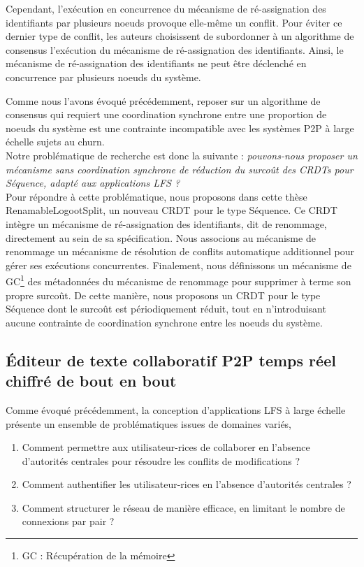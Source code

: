 Cependant, l'exécution en concurrence du mécanisme de ré-assignation des identifiants par plusieurs noeuds provoque elle-même un conflit.
Pour éviter ce dernier type de conflit, les auteurs choisissent de subordonner à un algorithme de consensus l'exécution du mécanisme de ré-assignation des identifiants.
Ainsi, le mécanisme de ré-assignation des identifiants ne peut être déclenché en concurrence par plusieurs noeuds du système.

Comme nous l'avons évoqué précédemment, reposer sur un algorithme de consensus qui requiert une coordination synchrone entre une proportion de noeuds du système est une contrainte incompatible avec les systèmes \ac{P2P} à large échelle sujets au churn.\\

Notre problématique de recherche est donc la suivante : \emph{pouvons-nous proposer un mécanisme sans coordination synchrone de réduction du surcoût des \acp{CRDT} pour Séquence, \ie adapté aux applications \ac{LFS} ?}\\

Pour répondre à cette problématique, nous proposons dans cette thèse RenamableLogootSplit, un nouveau \ac{CRDT} pour le type Séquence.
Ce \ac{CRDT} intègre un mécanisme de ré-assignation des identifiants, dit de renommage, directement au sein de sa spécification.
Nous associons au mécanisme de renommage un mécanisme de résolution de conflits automatique additionnel pour gérer ses exécutions concurrentes.
Finalement, nous définissons un mécanisme de \acf{GC}\footnote{\acf{GC} : Récupération de la mémoire} des métadonnées du mécanisme de renommage pour supprimer à terme son propre surcoût.
De cette manière, nous proposons un \ac{CRDT} pour le type Séquence dont le surcoût est périodiquement réduit, tout en n'introduisant aucune contrainte de coordination synchrone entre les noeuds du système.

\subsection{Éditeur de texte collaboratif \ac{P2P} temps réel chiffré de bout en bout}
\label{sec:research-questions-mute}

Comme évoqué précédemment, la conception d'applications \ac{LFS} à large échelle présente un ensemble de problématiques issues de domaines variés, \eg
\begin{enumerate}
    \item Comment permettre aux utilisateur-rices de collaborer en l'absence d'autorités centrales pour résoudre les conflits de modifications ?
    \item Comment authentifier les utilisateur-rices en l'absence d'autorités centrales ?
    \item Comment structurer le réseau de manière efficace, \ie en limitant le nombre de connexions par pair ?
\end{enumerate}

